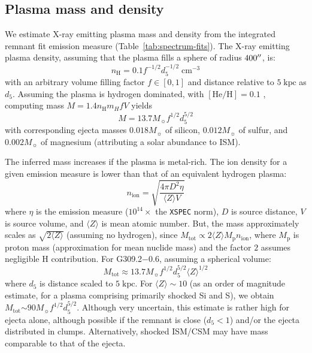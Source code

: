 \documentclass[twocolumn,tighten,trackchanges]{aastex61}
\newcommand*{\mt}{\mathrm}
\newcommand*{\unit}[1]{\;\mt{#1}}  %
\newcommand*{\abt}{\mathord{\sim}} %
\newcommand*{\Gsnr}{G309.2$-$0.6}
\begin{document}
\subsection{Plasma mass and density}

We estimate X-ray emitting plasma mass and density from the integrated remnant
fit emission measure (Table~\ref{tab:spectrum-fits}).
The X-ray emitting plasma density, assuming that the plasma fills a sphere of
radius $400\mbox{$^{\prime\prime}$}$, is:
\begin{equation} \label{eq:density}
    n_{\mt{H}} = 0.1 f^{-1/2} d_{5}^{-1/2} \unit{cm^{-3}}
\end{equation}
with an arbitrary volume filling factor $f \in [0,1]$ and distance relative to
$5 \unit{kpc}$ as $d_{5}$.
Assuming the plasma is hydrogen dominated, with $[\mt{He}/\mt{H}] = 0.1$
\citep{wilms2000}, computing mass $M = 1.4 n_{\mt{H}} m_{H} f V$ yields
\[
    M = 13.7 M_{\sun} f^{1/2} d_{5}^{5/2}
\]
with corresponding ejecta masses $0.018 M_{\sun}$ of silicon, $0.012 M_{\sun}$
of sulfur, and $0.002 M_{\sun}$ of magnesium (attributing a solar abundance to
ISM).

The inferred mass increases if the plasma is metal-rich.
The ion density for a given emission measure is lower than that of an
equivalent hydrogen plasma:
\[
    n_{\mt{ion}} = \sqrt{\frac{4 \pi D^2 \eta}{\langle Z \rangle V}}
\]
where $\eta$ is the emission measure ($10^{14}\times$ the \texttt{XSPEC} norm),
$D$ is source distance, $V$ is source volume, and $\langle Z \rangle$ is mean
atomic number.
But, the mass approximately scales as $\sqrt{2 \langle Z \rangle}$ (assuming no
hydrogen), since
$M_{\mt{tot}} \propto 2 \langle Z \rangle M_{\mt{p}} n_{\mt{ion}}$,
where $M_{\mt{p}}$ is proton mass (approximation for mean nuclide mass) and the
factor $2$ assumes negligible H contribution.
For \Gsnr{}, assuming a spherical volume:
\[
    M_{\mt{tot}} \approx 13.7 M_{\sun} f^{1/2} d_5^{5/2} \langle Z \rangle^{1/2}
\]
where $d_5$ is distance scaled to $5 \unit{kpc}$.
For $\langle Z \rangle \sim 10$ (as an order of magnitude estimate, for a
plasma comprising primarily shocked Si and S), we obtain
$M_{\mt{tot}} \abt 90 M_{\sun} f^{1/2} d_5^{5/2}$.
Although very uncertain, this estimate is rather high for ejecta alone,
although possible if the remnant is close ($d_5 < 1$) and/or the ejecta
distributed in clumps.
Alternatively, shocked ISM/CSM may have mass comparable to that of the ejecta.
\end{document}
